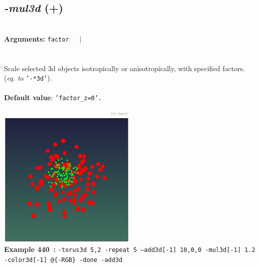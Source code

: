 \documentclass[a4paper,11pt,twoside]{book}
\begin{document}
\subsection{\emph{-mul3d} (+)}\vspace*{-0.5em}
~\\\textbf{Arguments: } 
{\small \texttt{factor}}~~~$|$\\
\\~\\
Scale selected 3d objects isotropically or anisotropically, with specified factors.
~\\(\emph{eq. to} {\small \texttt{'-*3d'}}).
~\\~\\\textbf{Default value}: {\small \texttt{'factor\_z=0'.}}
\begin{center}\includegraphics[keepaspectratio=true,height=7cm,width=\textwidth]{img/gmic_def440.jpg}\\
{\footnotesize \textbf{Example 440~:} \texttt{-torus3d 5,2 -repeat 5 --add3d[-1] 10,0,0 -mul3d[-1] 1.2 -color3d[-1] @\{-RGB\} -done -add3d}}
\end{center}
\end{document}
